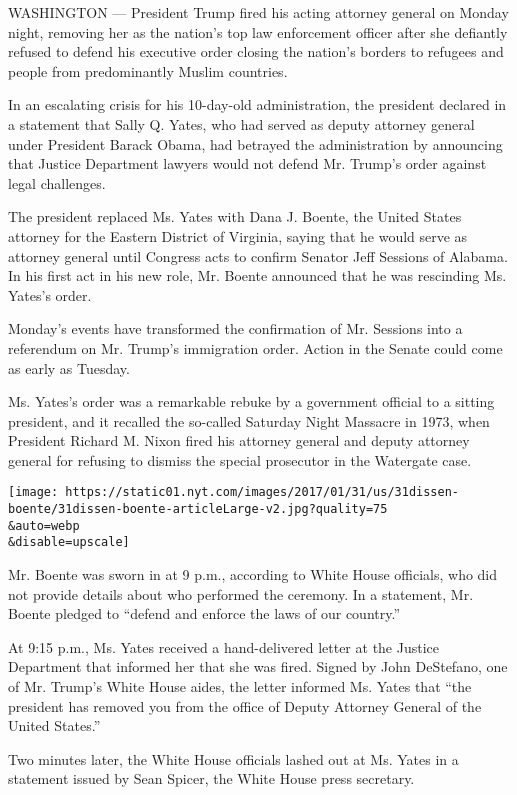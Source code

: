 WASHINGTON --- President Trump fired his acting attorney general on
Monday night, removing her as the nation's top law enforcement officer
after she defiantly refused to defend his executive order closing the
nation's borders to refugees and people from predominantly Muslim
countries.

In an escalating crisis for his 10-day-old administration, the president
declared in a statement that Sally Q. Yates, who had served as deputy
attorney general under President Barack Obama, had betrayed the
administration by announcing that Justice Department lawyers would not
defend Mr. Trump's order against legal challenges.

The president replaced Ms. Yates with Dana J. Boente, the United States
attorney for the Eastern District of Virginia, saying that he would
serve as attorney general until Congress acts to confirm Senator Jeff
Sessions of Alabama. In his first act in his new role, Mr. Boente
announced that he was rescinding Ms. Yates's order.

Monday's events have transformed the confirmation of Mr. Sessions into a
referendum on Mr. Trump's immigration order. Action in the Senate could
come as early as Tuesday.

Ms. Yates's order was a remarkable rebuke by a government official to a
sitting president, and it recalled the so-called Saturday Night Massacre
in 1973, when President Richard M. Nixon fired his attorney general and
deputy attorney general for refusing to dismiss the special prosecutor
in the Watergate case.

\texttt{[image: https://static01.nyt.com/images/2017/01/31/us/31dissen-boente/31dissen-boente-articleLarge-v2.jpg?quality=75\\\&auto=webp\\\&disable=upscale]}

Mr. Boente was sworn in at 9 p.m., according to White House officials,
who did not provide details about who performed the ceremony. In a
statement, Mr. Boente pledged to ``defend and enforce the laws of our
country.''

At 9:15 p.m., Ms. Yates received a hand-delivered letter at the Justice
Department that informed her that she was fired. Signed by John
DeStefano, one of Mr. Trump's White House aides, the letter informed Ms.
Yates that ``the president has removed you from the office of Deputy
Attorney General of the United States.''

Two minutes later, the White House officials lashed out at Ms. Yates in
a statement issued by Sean Spicer, the White House press secretary.

